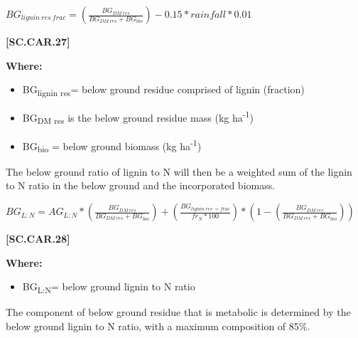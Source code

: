     \begin{center}
\(BG_{lignin\ res\ frac}=(\frac{BG_{DM\ res}}{BG_{DM\ res}+BG_{bio}})-0.15 * rainfall * 0.01	\)
    \end{center}
        \vspace{0.5cm} 
    
            {\raggedleft \textbf{[SC.CAR.27]}\par}
            \vspace{0.5cm}

        \textbf{Where:}
            
        \begin{itemize}
            \item BG\textsubscript{lignin res}=	below ground residue comprised of lignin (fraction)
            \item BG\textsubscript{DM res} is the below ground residue mass (kg ha\textsuperscript{-1})
            \item BG\textsubscript{bio} = below ground biomass (kg ha\textsuperscript{-1})
        \end{itemize}
        \vspace{0.5cm}

The below ground ratio of lignin to N will then be a weighted sum of the lignin to N ratio in the below ground and the incorporated biomass.
        \vspace{0.5cm}

    \begin{center}
\(BG_{L:N}=AG_{L:N} * (\frac{BG_{DM\ res}}{BG_{DM\ res}+BG_{bio}}) + (\frac{BG_{lignin\ res\ =frac}}{fr_N * 100}) * (1-(\frac{BG_{DM\ res}}{BG_{DM\ res}+BG_{bio}}))\)
    \end{center}
        \vspace{0.5cm} 
    
            {\raggedleft \textbf{[SC.CAR.28]}\par}
            \vspace{0.5cm}

        \textbf{Where:}
            
        \begin{itemize}
            \item BG\textsubscript{L:N}=	below ground lignin to N ratio
        \end{itemize}
        \vspace{0.5cm}

The component of below ground residue that is metabolic is determined by the below ground lignin to N ratio, with a maximum composition of 85\%.
        \vspace{0.5cm}

